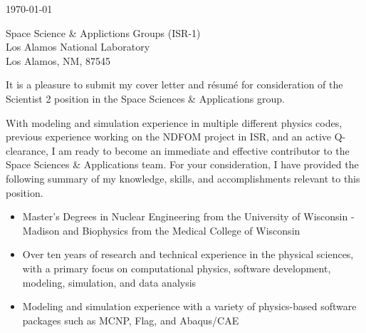 
\begin{center}
\begin{minipage}{\textwidth}

  \normalsize

  \vspace{6mm} 

  \today \\
  \vspace{4mm}
	
	Space Science \& Applictions Groups (ISR-1) \\
	Los Alamos National Laboratory \\
	Los Alamos, NM, 87545 \\
  
  \vspace{4mm} 


	It is a pleasure to submit my cover letter and r\'{e}sum\'{e} for consideration of the Scientist 2 position in the Space Sciences \& Applications group.

	With modeling and simulation experience in multiple different physics codes, previous experience working on the NDFOM project in ISR, and an active Q-clearance, I am ready to become an immediate and effective contributor to the Space Sciences \& Applications team.
  For your consideration, I have provided the following summary of my knowledge, skills, and accomplishments relevant to this position. \\

  \begin{itemize}[leftmargin=.45in,rightmargin=.45in,itemsep=1.6mm]

	\item Master's Degrees in Nuclear Engineering from the University of Wisconsin - Madison and Biophysics from the Medical College of Wisconsin

	\item Over ten years of research and technical experience in the physical sciences, with a primary focus on computational physics, software development, modeling, simulation, and data analysis

	\item Modeling and simulation experience with a variety of physics-based software packages such as MCNP, Flag, and Abaqus/CAE


\end{itemize}
\end{minipage}
\end{center}
